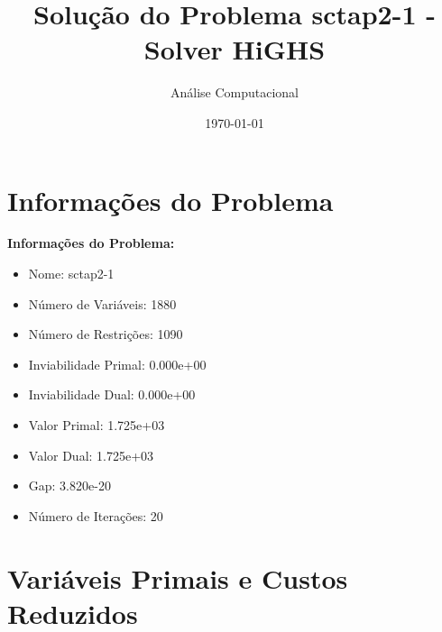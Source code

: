 \documentclass[12pt]{article}
\title{Solução do Problema sctap2-1 - Solver HiGHS}
\author{Análise Computacional}
\date{\today}
\begin{document}
\maketitle

\section{Informações do Problema}

\textbf{Informações do Problema:}
\begin{itemize}
\item Nome: sctap2-1
\item Número de Variáveis: 1880
\item Número de Restrições: 1090
\item Inviabilidade Primal: 0.000e+00
\item Inviabilidade Dual: 0.000e+00
\item Valor Primal: 1.725e+03
\item Valor Dual: 1.725e+03
\item Gap: 3.820e-20
\item Número de Iterações: 20
\end{itemize}


\section{Variáveis Primais e Custos Reduzidos}
\end{document}
